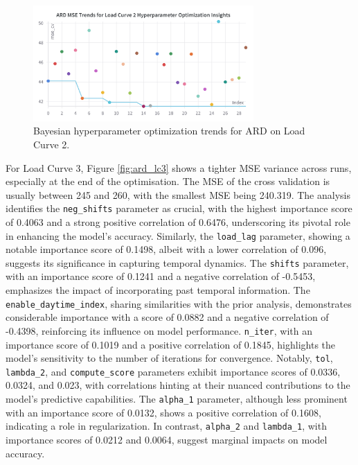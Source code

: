 \documentclass{article} %
\begin{document}
\begin{figure}[H]
    \centering
    \includegraphics[width=0.75\textwidth]{ressources/Hyperparams/ard/ARD MSE Trends for Load Curve 2 Hyperparameter Optimization Insights.png}
    \caption{Bayesian hyperparameter optimization trends for ARD on Load Curve 2.}
    \label{fig:ard_lc2}
\end{figure}
For Load Curve 3, Figure \ref{fig:ard_lc3} shows a tighter \gls*{MSE} variance across runs, especially at the end of the optimisation. The MSE of the cross validation is usually between 245 and 260, with the smallest MSE being 240.319.
The analysis identifies the \texttt{neg\_shifts} parameter as crucial, with the highest importance score of 0.4063 and a strong positive correlation of 0.6476, underscoring its pivotal role in enhancing the model's accuracy. Similarly, the \texttt{load\_lag} parameter, showing a notable importance score of 0.1498, albeit with a lower correlation of 0.096, suggests its significance in capturing temporal dynamics. The \texttt{shifts} parameter, with an importance score of 0.1241 and a negative correlation of -0.5453, emphasizes the impact of incorporating past temporal information. The \texttt{enable\_daytime\_index}, sharing similarities with the prior analysis, demonstrates considerable importance with a score of 0.0882 and a negative correlation of -0.4398, reinforcing its influence on model performance. \texttt{n\_iter}, with an importance score of 0.1019 and a positive correlation of 0.1845, highlights the model's sensitivity to the number of iterations for convergence. Notably, \texttt{tol}, \texttt{lambda\_2}, and \texttt{compute\_score} parameters exhibit importance scores of 0.0336, 0.0324, and 0.023, with correlations hinting at their nuanced contributions to the model's predictive capabilities. The \texttt{alpha\_1} parameter, although less prominent with an importance score of 0.0132, shows a positive correlation of 0.1608, indicating a role in regularization. In contrast, \texttt{alpha\_2} and \texttt{lambda\_1}, with importance scores of 0.0212 and 0.0064, suggest marginal impacts on model accuracy. 
\end{document}
